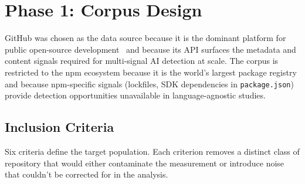 \section{Phase 1: Corpus Design}
\label{sec:meth:corpus}

GitHub was chosen as the data source because it is the dominant platform for public open-source development~\cite{dabic2021} and because its API surfaces the metadata and content signals required for multi-signal AI detection at scale. The corpus is restricted to the npm ecosystem because it is the world's largest package registry and because npm-specific signals (lockfiles, SDK dependencies in \texttt{package.json}) provide detection opportunities unavailable in language-agnostic studies.

\subsection{Inclusion Criteria}

Six criteria define the target population. Each criterion removes a distinct class of repository that would either contaminate the measurement or introduce noise that couldn't be corrected for in the analysis.

